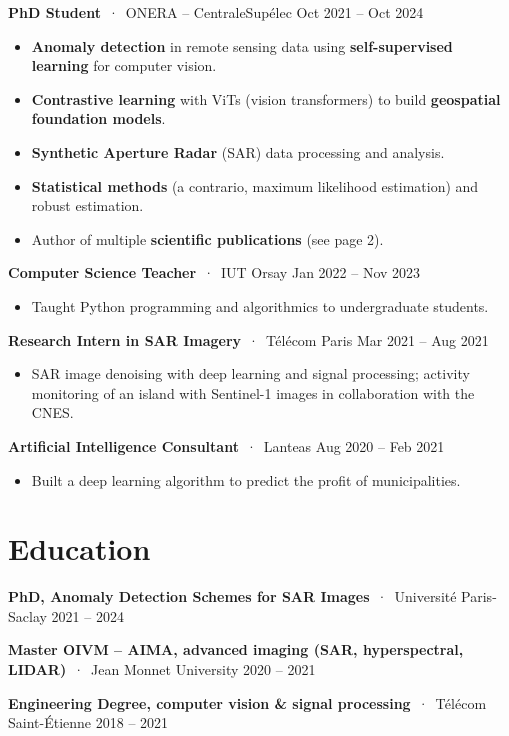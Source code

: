 \documentclass[10pt,a4paper]{article}
\newcommand{\entry}[3]{%
  \noindent\textbf{#1} \,{\color{cvgreen}·}\, {\color{cvgreen}#2}%
  \hfill {\color{cvgray}\small #3}\par}
\begin{document}
\entry{PhD Student}{ONERA -- CentraleSupélec}{Oct 2021 -- Oct 2024}
\begin{itemize}
  \item \textbf{Anomaly detection} in remote sensing data using \textbf{self-supervised learning} for computer vision.
  \item \textbf{Contrastive learning} with ViTs (vision transformers) to build \textbf{geospatial foundation models}.
  \item \textbf{Synthetic Aperture Radar} (SAR) data processing and analysis.
  \item \textbf{Statistical methods} (a contrario, maximum likelihood estimation) and robust estimation.
  \item Author of multiple \textbf{scientific publications} (see page 2).
\end{itemize}

\entry{Computer Science Teacher}{IUT Orsay}{Jan 2022 -- Nov 2023}
\begin{itemize}
  \item Taught Python programming and algorithmics to undergraduate students.
\end{itemize}

\entry{Research Intern in SAR Imagery}{Télécom Paris}{Mar 2021 -- Aug 2021}
\begin{itemize}
  \item SAR image denoising with deep learning and signal processing; activity monitoring of an island with Sentinel-1 images in collaboration with the CNES.
\end{itemize}

\entry{Artificial Intelligence Consultant}{Lanteas}{Aug 2020 -- Feb 2021}
\begin{itemize}
  \item Built a deep learning algorithm to predict the profit of municipalities.
\end{itemize}

\section{Education}

\entry{PhD, Anomaly Detection Schemes for SAR Images}{Université Paris-Saclay}{2021 -- 2024}

\entry{Master OIVM -- AIMA, advanced imaging (SAR, hyperspectral, LIDAR)}{Jean Monnet University}{2020 -- 2021}

\entry{Engineering Degree, computer vision \& signal processing}{Télécom Saint-Étienne}{2018 -- 2021}
\end{document}
